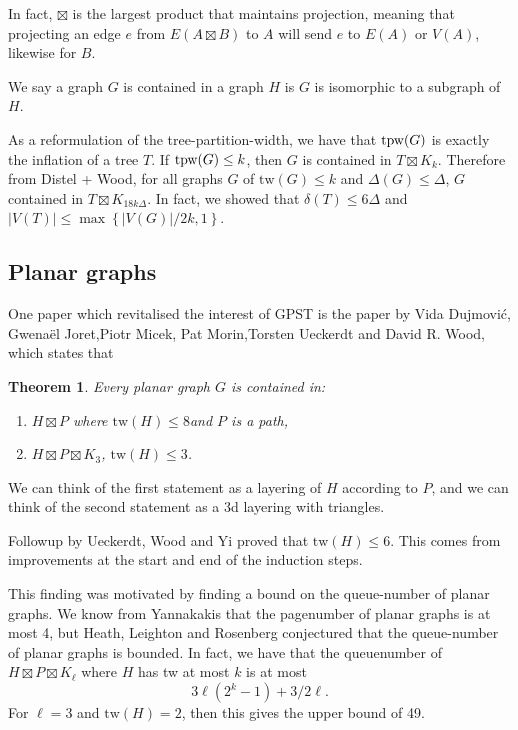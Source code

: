 \documentclass[]{article}
\newcommand{\tw}{\text{tw}}
\newtheorem{theorem}{Theorem}
\theoremstyle{definition}
\numberwithin{theorem}{section}
\numberwithin{equation}{section}
\begin{document}
In fact, $\boxtimes$ is the largest product that maintains projection, meaning that projecting an edge $e$ from $E(A \boxtimes B)$ to $A$ will send $e$ to $E(A)$ or $V(A)$, likewise for $B$. 

We say a graph $G$ is contained in a graph $H$ is $G$ is isomorphic to a subgraph of $H$.

As a reformulation of the tree-partition-width, we have that $\text{tpw}(G)$ is exactly the inflation of a tree $T$. If $\text{tpw}(G) \leq k$, then $G$ is contained in $T \boxtimes K_{k}$. Therefore from Distel + Wood, for all graphs $G$ of $\tw(G) \leq k$ and $\Delta(G) \leq \Delta$, $G$ contained in $T \boxtimes K_{18 k \Delta}$. In fact, we showed that $\delta(T) \leq 6 \Delta$ and $|V(T)|  \leq \max \left\{|V(G)|/2k , 1\right\}$.

\subsection{Planar graphs}
One paper which revitalised the interest of GPST is the paper by Vida Dujmović, Gwenaël Joret,Piotr Micek, Pat Morin,Torsten Ueckerdt and David R. Wood, which states that
\begin{theorem}
	Every planar graph $G$ is contained in:
	\begin{enumerate}
		\item $H \boxtimes P$ where $\tw(H) \leq 8$and $P$ is a path,
		\item $H \boxtimes P \boxtimes K_3$, $\tw(H) \leq 3$. 
	\end{enumerate}
\end{theorem}

We can think of the first statement as a layering of $H$ according to $P$, and we can think of the second statement as a 3d layering with triangles.

Followup by Ueckerdt, Wood and Yi proved that $\tw(H) \leq 6$. This comes from improvements at the start and end of the induction steps. 

This finding was motivated by finding a bound on the queue-number of planar graphs. We know from Yannakakis that the pagenumber of planar graphs is at most 4, but Heath, Leighton and Rosenberg conjectured that the queue-number of planar graphs is bounded. In fact, we have that the queuenumber of $H \boxtimes P \boxtimes K_\ell$ where $H$ has tw at most $k$ is at most 
\begin{equation}
	3 \ell (2^k - 1) + 3/2 \ell.
\end{equation}
For $\ell = 3$ and $\tw(H)  = 2$, then this gives the upper bound of 49.
\end{document}
